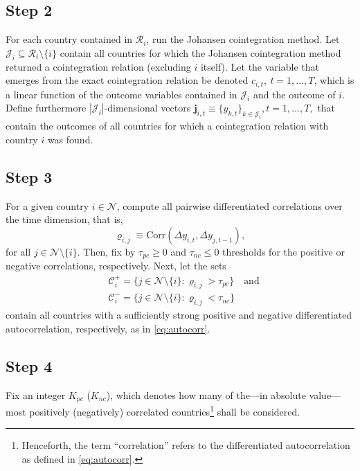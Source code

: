 \documentclass{article}
\begin{document}
\subsection{Step 2}
For each country contained in $\mathcal{R}_i$, run the Johansen cointegration method. Let $\mathcal{J}_i \subseteq \mathcal{R}_i \setminus \{ i\}$ contain all countries for which the Johansen cointegration method returned a cointegration relation (excluding $i$ itself). Let the variable that emerges from the exact cointegration relation be denoted $c_{i,t},\ t=1,\dots,T$, which is a linear function of the outcome variables contained in  $\mathcal{J}_i$ and the outcome of $i$. 
Define furthermore $|\mathcal{J}_i|$-dimensional vectors $\mathbf{j}_{i,t} \equiv \big\{ y_{k,t} \big\}_{k \in \mathcal{J}_i}, t = 1,\dots,T,$ that contain the outcomes of all countries for which a cointegration relation with country $i$ was found.

\subsection{Step 3}
For a given country $i \in \mathcal{N}$, compute all pairwise differentiated correlations over the time dimension, that is, 
\begin{equation}
    \varrho_{i,j} \equiv \text{Corr}(\Delta y_{i,t}, \Delta y_{j,t-1}),
    \label{eq:autocorr}
\end{equation}
for all $j \in \mathcal{N}\setminus \{ i \}$. Then, fix by $\tau_{pc} \geq 0$ and $\tau_{nc} \leq 0$ thresholds for the positive or negative correlations, respectively.
Next, let the sets 
\begin{align*}
    &\mathcal{C}_i^+ = \{ j \in \mathcal{N}\setminus \{ i \} : \varrho_{i,j} > \tau_{pc}\}
    \quad \text{and} \\
    &\mathcal{C}_i^- = \{ j \in \mathcal{N}\setminus \{ i \} : \varrho_{i,j} < \tau_{nc}\}
\end{align*}
contain all countries with a sufficiently strong positive and negative differentiated autocorrelation, respectively, as in \eqref{eq:autocorr}.

\subsection{Step 4}
Fix an integer $K_{pc}$ ($K_{nc}$), which denotes how many of the---in absolute value---most positively (negatively) correlated countries\footnote{Henceforth, the term ``correlation'' refers to the differentiated  autocorrelation as defined in \eqref{eq:autocorr}.}  shall be considered. 
\end{document}
